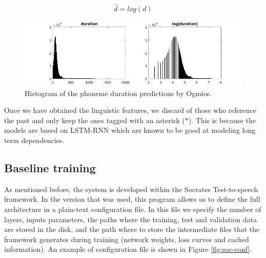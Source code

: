 \begin{equation}
    \hat{d} = log(d)
\end{equation}

\begin{figure}[h]
    \centering
    \includegraphics[width=14cm]{figures/dur}
    \caption{Histogram of the phoneme duration predictions by Ogmios.}
    \label{fig:hist-d}
\end{figure}

Once we have obtained the linguistic features, we discard of those who reference the past and only keep the ones tagged with an asterisk ($*$). This is because the models are based on LSTM-RNN which are known to be good at modeling long term dependencies\cite{hochreiter1997long}.

\subsection{Baseline training}

As mentioned before, the system is developed within the Socrates Test-to-speech framework. In the version that was used, this program allows us to define the full architecture in a plain-text configuration file. In this file we specify the number of layers, inputs parameters, the paths where the training, test and validation data are stored in the disk, and the path where to store the intermediate files that the framework generates during training (network weights, loss curves and cached information). An example of configuration file is shown in Figure \ref{fig:soc-conf}.

